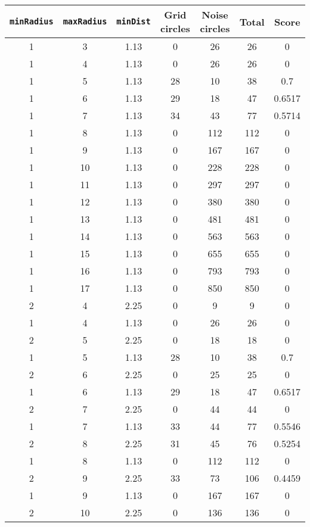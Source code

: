 \documentclass[letterpaper, 12pt]{article}
\begin{document}
\begin{longtable}{|c|c|c|c|c|c|c|}
\hline
\textbf{\texttt{minRadius}} & \textbf{\texttt{maxRadius}} & \textbf{\texttt{minDist}} & \textbf{Grid circles} & \textbf{Noise circles} & \textbf{Total} & \textbf{Score} \\
\hline
1 & 3 & 1.13 & 0 & 26 & 26 & 0 \\
\hline
1 & 4 & 1.13 & 0 & 26 & 26 & 0 \\
\hline
1 & 5 & 1.13 & 28 & 10 & 38 & 0.7 \\
\hline
1 & 6 & 1.13 & 29 & 18 & 47 & 0.6517 \\
\hline
1 & 7 & 1.13 & 34 & 43 & 77 & 0.5714 \\
\hline
1 & 8 & 1.13 & 0 & 112 & 112 & 0 \\
\hline
1 & 9 & 1.13 & 0 & 167 & 167 & 0 \\
\hline
1 & 10 & 1.13 & 0 & 228 & 228 & 0 \\
\hline
1 & 11 & 1.13 & 0 & 297 & 297 & 0 \\
\hline
1 & 12 & 1.13 & 0 & 380 & 380 & 0 \\
\hline
1 & 13 & 1.13 & 0 & 481 & 481 & 0 \\
\hline
1 & 14 & 1.13 & 0 & 563 & 563 & 0 \\
\hline
1 & 15 & 1.13 & 0 & 655 & 655 & 0 \\
\hline
1 & 16 & 1.13 & 0 & 793 & 793 & 0 \\
\hline
1 & 17 & 1.13 & 0 & 850 & 850 & 0 \\
\hline
2 & 4 & 2.25 & 0 & 9 & 9 & 0 \\
\hline
1 & 4 & 1.13 & 0 & 26 & 26 & 0 \\
\hline
2 & 5 & 2.25 & 0 & 18 & 18 & 0 \\
\hline
1 & 5 & 1.13 & 28 & 10 & 38 & 0.7 \\
\hline
2 & 6 & 2.25 & 0 & 25 & 25 & 0 \\
\hline
1 & 6 & 1.13 & 29 & 18 & 47 & 0.6517 \\
\hline
2 & 7 & 2.25 & 0 & 44 & 44 & 0 \\
\hline
1 & 7 & 1.13 & 33 & 44 & 77 & 0.5546 \\
\hline
2 & 8 & 2.25 & 31 & 45 & 76 & 0.5254 \\
\hline
1 & 8 & 1.13 & 0 & 112 & 112 & 0 \\
\hline
2 & 9 & 2.25 & 33 & 73 & 106 & 0.4459 \\
\hline
1 & 9 & 1.13 & 0 & 167 & 167 & 0 \\
\hline
2 & 10 & 2.25 & 0 & 136 & 136 & 0 \\

\end{longtable}
\end{document}
